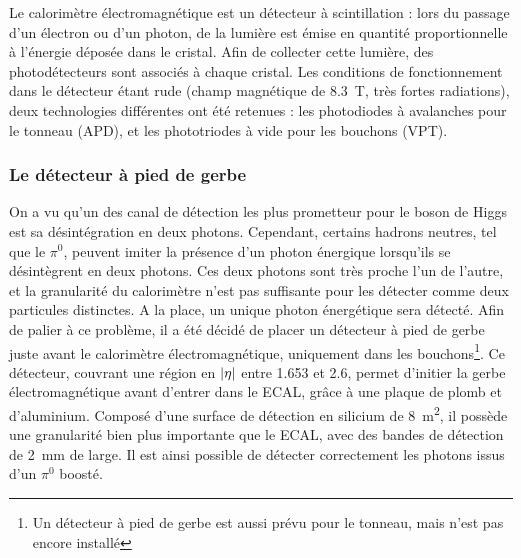 \medskip

Le calorimètre électromagnétique est un détecteur à scintillation : lors du passage d'un électron ou d'un photon, de la lumière est émise en quantité proportionnelle à l'énergie déposée dans le cristal. Afin de collecter cette lumière, des photodétecteurs sont associés à chaque cristal. Les conditions de fonctionnement dans le détecteur étant rude (champ magnétique de \SI{8.3}{\tesla}, très fortes radiations), deux technologies différentes ont été retenues : les photodiodes à avalanches pour le tonneau (APD), et les phototriodes à vide pour les bouchons (VPT).

\subsubsection{Le détecteur à pied de gerbe}

On a vu qu'un des canal de détection les plus prometteur pour le boson de Higgs est sa désintégration en deux photons. Cependant, certains hadrons neutres, tel que le $\pi^0$, peuvent imiter la présence d'un photon énergique lorsqu'ils se désintègrent en deux photons. Ces deux photons sont très proche l'un de l'autre, et la granularité du calorimètre n'est pas suffisante pour les détecter comme deux particules distinctes. A la place, un unique photon énergétique sera détecté. Afin de palier à ce problème, il a été décidé de placer un détecteur à pied de gerbe juste avant le calorimètre électromagnétique, uniquement dans les bouchons\footnote{Un détecteur à pied de gerbe est aussi prévu pour le tonneau, mais n'est pas encore installé}. Ce détecteur, couvrant une région en $\lvert \eta \rvert$ entre \num{1.653} et \num{2.6}, permet d'initier la gerbe électromagnétique avant d'entrer dans le ECAL, grâce à une plaque de plomb et d'aluminium. Composé d'une surface de détection en silicium de \SI{8}{\square\meter}, il possède une granularité bien plus importante que le ECAL, avec des bandes de détection de \SI{2}{\mm} de large. Il est ainsi possible de détecter correctement les photons issus d'un $\pi^0$ boosté.

